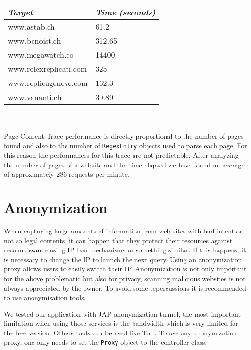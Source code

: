 \documentclass[
	a4paper,					10pt,							twoside,					openright,				notitlepage,			parskip=half,			]{scrreprt}
\begin{document}
\\
\begin{minipage}[H][4cm][b]{0,5\textwidth}
\centering
\begin{tabular}{l|l}
\textit{\textbf{Target}}   & \textit{\textbf{Time (seconds)}} \\ \hline
www.astab.ch             & 61.2                             \\
www.benoist.ch           & 312.65                            \\
www.megawatch.co                 & 14400                            \\
www.rolexreplicati.com          & 325                           \\
www.replicageneve.com              & 162.3                           \\
www.vananti.ch             & 30.89                            \\
\end{tabular}
 \label{tab:pageContentTraceTable} 
\end{minipage}
\\\\Page Content Trace performance is directly proportional to the number of pages found and also to 
the number of \verb|RegexEntry| objects used to parse each page. For this reason the performances for 
this trace are not predictable. After analyzing the number of pages of a website and the time elapsed we 
have found an average of approximately 286 requests per minute.

\section{Anonymization}
\label{sec:secperf_anonymization}

When capturing large amounts of information from web sites with bad intent or not so legal contents, 
it can happen that they protect their resources against reconnaissance using \gls{IP} ban mechanisms or something similar. 
If this happens, it is necessary to change the \gls{IP} to launch the next query. Using an anonymization proxy allows users to easily 
switch their \gls{IP}. Anonymization is not only important for the above problematic but also for privacy, 
scanning malicious websites is not always appreciated by the owner. To avoid some repercussions 
it is recommended to use anonymization tools.

We tested our application with \gls{JAP} \cite{an:jap} anonymization tunnel, the most important limitation when using those 
services is the bandwidth which is very limited for the free version. Others tools can be used like Tor \cite{an:tor}.
To use any anonymization proxy, one only needs to set the \verb|Proxy| object to the controller class.
\end{document}
